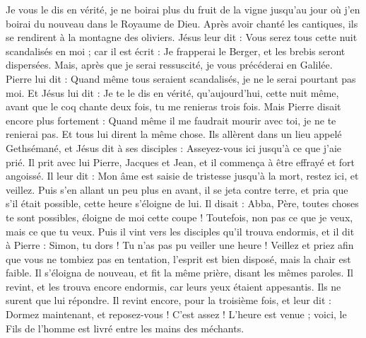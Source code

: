 \begin{multicols}{2}
Je vous le dis en vérité, je ne boirai plus du fruit de la vigne jusqu'au jour où j’en boirai du nouveau dans le Royaume de Dieu.
Après avoir chanté les cantiques{}, ils se rendirent à la montagne des oliviers.
Jésus leur dit : Vous serez tous cette nuit scandalisés en moi ; car il est écrit : Je frapperai le Berger, et les brebis seront dispersées{}.
Mais, après que je serai ressuscité, je vous précéderai en Galilée.
Pierre lui dit : Quand même tous seraient scandalisés, je ne le serai pourtant pas moi.
Et Jésus lui dit : Je te le dis en vérité, qu'aujourd'hui, cette nuit même, avant que le coq chante deux fois, tu me renieras trois fois.
Mais Pierre disait encore plus fortement : Quand même il me faudrait mourir avec toi, je ne te renierai pas. Et tous lui dirent la même chose.
Ils allèrent dans un lieu appelé Gethsémané, et Jésus dit à ses disciples : Asseyez-vous ici jusqu'à ce que j’aie prié.
Il prit avec lui Pierre, Jacques et Jean, et il commença à être effrayé et fort angoissé.
Il leur dit : Mon âme est saisie de tristesse jusqu’à la mort, restez ici, et veillez.
Puis s'en allant un peu plus en avant, il se jeta contre terre, et pria que s'il était possible, cette heure s’éloigne de lui.
Il disait : Abba, Père, toutes choses te sont possibles, éloigne de moi cette coupe ! Toutefois, non pas ce que je veux, mais ce que tu veux.
Puis il vint vers les disciples qu’il trouva endormis, et il dit à Pierre : Simon, tu dors ! Tu n’as pas pu veiller une heure !
Veillez et priez afin que vous ne tombiez pas en tentation, l'esprit est bien disposé, mais la chair est faible.
Il s’éloigna de nouveau, et fit la même prière, disant les mêmes paroles.
Il revint, et les trouva encore endormis, car leurs yeux étaient appesantis. Ils ne surent que lui répondre.
Il revint encore, pour la troisième fois, et leur dit : Dormez maintenant, et reposez-vous ! C’est assez ! L’heure est venue ; voici, le Fils de l'homme est livré entre les mains des méchants.

\end{multicols}
